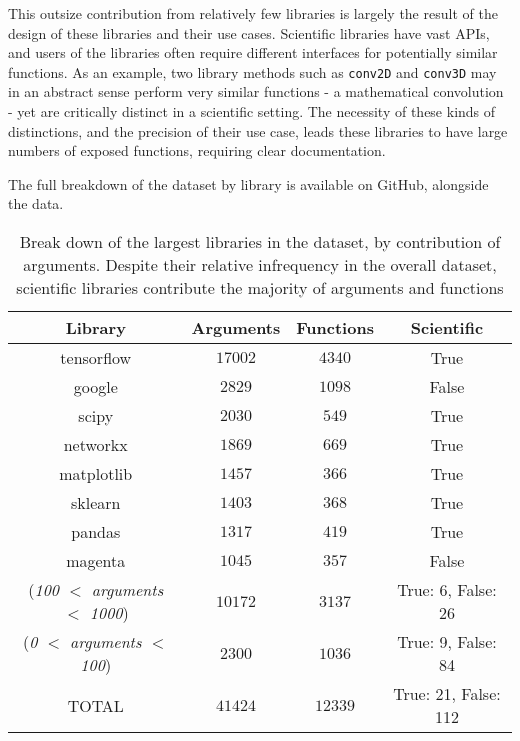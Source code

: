 This outsize contribution from relatively few libraries is largely the result of the design of these libraries and their use cases. 
Scientific libraries have vast APIs, and users of the libraries often require different interfaces for potentially similar functions. 
As an example, two library methods such as \texttt{conv2D} and \texttt{conv3D} may in an abstract sense perform very similar functions - a mathematical convolution - yet are critically distinct in a scientific setting.
The necessity of these kinds of distinctions, and the precision of their use case, leads these libraries to have large numbers of exposed functions, requiring clear documentation.

The full breakdown of the dataset by library is available on GitHub, alongside the data.

\begin{table}[h!]
    \begin{center}
    \begin{tabular}{c | c | c | c}
        Library      & Arguments     & Functions  & Scientific \\
    \hline
        tensorflow   & $ 17002 $     & $ 4340 $ & True \\
        google   & $ 2829 $      & $ 1098 $ & False \\
        scipy    & $ 2030 $      & $ 549 $ & True \\
        networkx     & $ 1869 $      & $ 669 $ & True \\
        matplotlib   & $ 1457 $      & $ 366 $ & True \\
        sklearn      & $ 1403 $      & $ 368 $ & True \\
        pandas   & $ 1317 $      & $ 419 $ & True \\
        magenta      & $ 1045 $      & $ 357 $ & False \\
        (\textit{100 $<$ arguments $<$ 1000})   & $ 10172 $     & $ 3137 $ & True: 6, False: 26 \\
        (\textit{0 $<$ arguments $<$ 100})      & $ 2300 $      & $ 1036 $ & True: 9, False: 84 \\
    \hline
    \hline
        TOTAL    & $ 41424 $     & $ 12339 $ & True: 21, False: 112 \\
    \end{tabular}
    \caption {Break down of the largest libraries in the dataset, by contribution of arguments. Despite their relative infrequency in the overall dataset, scientific libraries contribute the majority of arguments and functions}
    \label{table:breakdown_by_library}
    \end{center}
\end{table}

